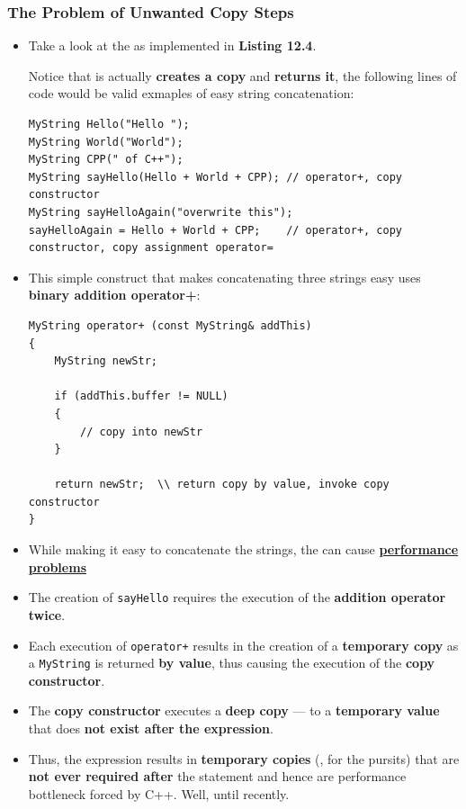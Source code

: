\documentclass[10pt]{article}
\newcommand{\pbreak}{\vspace{30pt}}
\begin{document}
\pbreak

\subsubsection{The Problem of Unwanted Copy Steps}
\begin{itemize}
	\item Take a look at the  as implemented in \textbf{Listing 12.4}.

		Notice that is actually \textbf{creates a copy} and \textbf{returns it}, the following lines of code would be valid exmaples of easy string concatenation:
		\begin{verbatim}
MyString Hello("Hello ");
MyString World("World");
MyString CPP(" of C++");
MyString sayHello(Hello + World + CPP);	// operator+, copy constructor
MyString sayHelloAgain("overwrite this");
sayHelloAgain = Hello + World + CPP;	// operator+, copy constructor, copy assignment operator=
		\end{verbatim}

		\item This simple construct that makes concatenating three strings easy uses \textbf{binary addition operator+}:

			\begin{verbatim}
MyString operator+ (const MyString& addThis)
{
	MyString newStr;

	if (addThis.buffer != NULL)
	{
		// copy into newStr
	}

	return newStr;	\\ return copy by value, invoke copy constructor
}
			\end{verbatim}

		\item While making it easy to concatenate the strings, the \textbf{} can cause \underline{\textbf{performance problems}}

		\item The creation of \verb|sayHello| requires the execution of the \textbf{addition operator twice}.

		\item Each execution of \verb|operator+| results in the creation of a \textbf{temporary copy} as a \verb|MyString| is returned \textbf{by value}, thus causing the execution of the \textbf{copy constructor}.

		\item The \textbf{copy constructor} executes a \textbf{deep copy} --- to a \textbf{temporary value} that does \textbf{not exist after the expression}.

		\item Thus, the expression results in \textbf{temporary copies} (, for the pursits) that are \textbf{not ever required after} the statement and hence are performance bottleneck forced by C++. Well, until recently.
\end{itemize}
\end{document}
